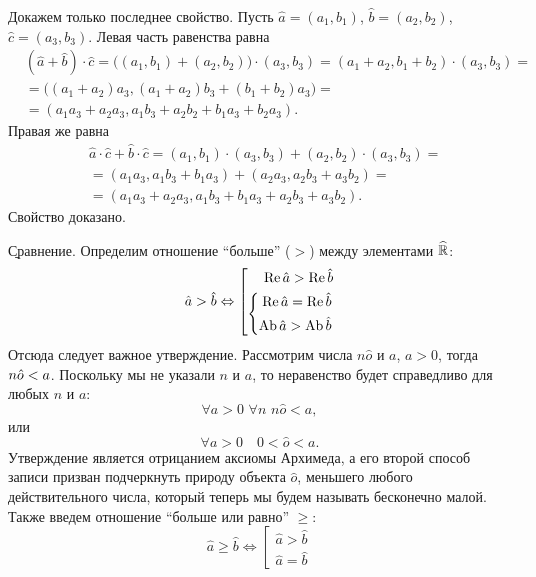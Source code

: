 Докажем только последнее свойство. Пусть $\hat{a}=(a_1, b_1)$, $\hat{b}=(a_2, b_2)$, $\hat{c}=(a_3, b_3)$. Левая часть равенства равна
\begin{eqnarray*}
	& (\hat{a}+\hat{b})\cdot\hat{c}=\big((a_1, b_1)+(a_2, b_2)\big)\cdot(a_3, b_3)=(a_1+a_2, b_1+b_2)\cdot(a_3, b_3)= \\
	& =\big((a_1+a_2)a_3, (a_1+a_2)b_3+(b_1+b_2)a_3\big) = \\
	& =(a_1a_3+a_2a_3, a_1b_3+a_2b_2+b_1a_3+b_2a_3).
\end{eqnarray*}
Правая же равна
\begin{eqnarray*}
	& \hat{a}\cdot\hat{c}+\hat{b}\cdot\hat{c}=(a_1, b_1)\cdot(a_3, b_3)+(a_2, b_2)\cdot(a_3, b_3)= \\
	& =(a_1a_3, a_1b_3+b_1a_3)+(a_2a_3, a_2b_3+a_3b_2)= \\
	& =(a_1a_3+a_2a_3, a_1b_3+b_1a_3+a_2b_3+a_3b_2).
\end{eqnarray*}
Свойство доказано.

\b{Сравнение.} Определим отношение ``больше'' ($>$) между элементами $\widehat{\mathbb{R}}$:
	\begin{equation}
	\hat{a}>\hat{b}
	  \Leftrightarrow
		\left[
			\begin{aligned}
				\operatorname{Re} \hat{a}>\operatorname{Re} \hat{b} \\
				\left\{
					\begin{aligned}
						\operatorname{Re} \hat{a}=\operatorname{Re} \hat{b} \\
						\operatorname{Ab}{\hat{a}}>\operatorname{Ab}{\hat{b}}
					\end{aligned}
				\right.
			\end{aligned}
		\right.
	\end{equation}
Отсюда следует важное утверждение. Рассмотрим числа $n\hat{o}$ и $a$, $a>0$, тогда $n\hat{o}\hm<a$. Поскольку мы не указали $n$ и $a$, то неравенство будет справедливо для любых $n$ и $a$:
	$$\forall a>0 \,\, \forall n \,\, n\hat{o}<a,$$
или
	\begin{equation}
		\forall a>0 \quad 0<\hat{o}<a.
	\end{equation}
Утверждение является отрицанием аксиомы Архимеда, а его второй способ записи призван подчеркнуть природу объекта $\hat{o}$, меньшего любого действительного числа, который теперь мы будем называть бесконечно малой.
Также введем отношение ``больше или равно'' $\ge$:
	\begin{equation}
	\hat{a}\ge\hat{b}
	  \Leftrightarrow
		\left[
			\begin{aligned}
				\hat{a}>\hat{b} \\
				\hat{a}=\hat{b}
			\end{aligned}
		\right.
	\end{equation}

